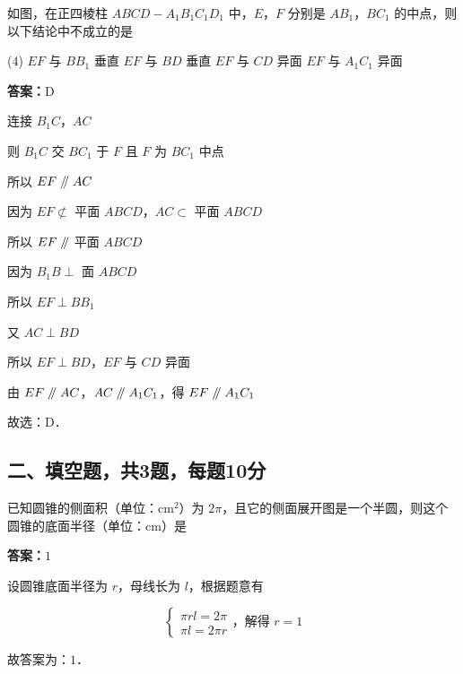 \vspace{2em}
\begin{example}[\bkstar{3}{5}]
如图，在正四棱柱 $ABCD-A_1B_1C_1D_1$ 中，$E$，$F$ 分别是 $AB_1$，$BC_1$ 的中点，则以下结论中不成立的是
\begin{tasks}(4)
    \task $EF$ 与 $BB_1$ 垂直
    \task $EF$ 与 $BD$ 垂直
    \task $EF$ 与 $CD$ 异面
    \task $EF$ 与 $A_1C_1$ 异面
\end{tasks}
\end{example}
\begin{solution}
\textbf{答案：}D

连接 $B_1C$，$AC$

则 $B_1C$ 交 $BC_1$ 于 $F$ 且 $F$ 为 $BC_1$ 中点

所以 $EF\mathrel{/\mkern-5mu/} AC$

因为 $EF\not\subset$ 平面 $ABCD$，$AC\subset$ 平面 $ABCD$

所以 $EF\mathrel{/\mkern-5mu/}$ 平面 $ABCD$

因为 $B_1B\perp$ 面 $ABCD$

所以 $EF\perp BB_1$

又 $AC\perp BD$

所以 $EF\perp BD$，$EF$ 与 $CD$ 异面

由 $EF\mathrel{/\mkern-5mu/} AC$，$AC\mathrel{/\mkern-5mu/} A_1C_1$，得 $EF\mathrel{/\mkern-5mu/} A_1C_1$

故选：D．
\end{solution}

\vspace{2em}

\subsection{二、填空题，共3题，每题10分}

\begin{example}[\bkstar{2}{5}]
已知圆锥的侧面积（单位：$\mathrm{cm}^2$）为 $2\pi$，且它的侧面展开图是一个半圆，则这个圆锥的底面半径（单位：$\mathrm{cm}$）是
\end{example}
\begin{solution}
\textbf{答案：}$1$

设圆锥底面半径为 $r$，母线长为 $l$，根据题意有

$$
\begin{cases}
\pi rl=2\pi\\
\pi l=2\pi r
\end{cases}\text{，解得 } r=1
$$

故答案为：$1$．
\end{solution}

